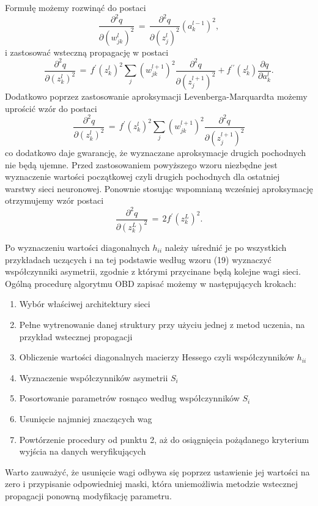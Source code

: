 Formułę możemy rozwinąć do postaci 
\begin{equation}
\frac{\partial^2 q}{\partial (w_{jk}^l)^2} \, = \, \frac{\partial^2 q}{\partial (z_j^{l})^2}(a_k^{l-1})^2 , 
\end{equation}
i zastosować wsteczną propagację w postaci
\begin{equation}
\frac{\partial^2q}{\partial (z_k^{l})^2} \, = \, f^{\prime}(z_k^l)^2 \sum_j (w_{jk}^{l+1})^2 \frac{\partial^2 q}{\partial (z_j^{l+1})^2} + f^{\prime \prime}(z_k^l) \frac{\partial q}{\partial a_k^l}. 
\end{equation}
Dodatkowo poprzez zastosowanie aproksymacji Levenberga-Marquardta możemy uprościć wzór do postaci
\begin{equation}
\frac{\partial^2q}{\partial (z_k^{l})^2} \, = \, f^{\prime}(z_k^l)^2 \sum_j (w_{jk}^{l+1})^2 \frac{\partial^2 q}{\partial (z_j^{l+1})^2}
\end{equation}
co dodatkowo daje gwarancję, że wyznaczane aproksymacje drugich pochodnych nie będą ujemne.
Przed zastosowaniem powyższego wzoru niezbędne jest wyznaczenie wartości początkowej czyli drugich pochodnych dla ostatniej warstwy sieci neuronowej. Ponownie stosując wspomnianą wcześniej aproksymację otrzymujemy wzór postaci
\begin{equation}
\frac{\partial^2q}{\partial (z_k^{L})^2} \, = \, 2f^{\prime}(z_k^{L})^2. 
\end{equation}
\par Po wyznaczeniu wartości diagonalnych \( h_{ii} \) należy uśrednić je po wszystkich przykładach uczących i na tej podstawie według wzoru (19) wyznaczyć współczynniki asymetrii, zgodnie z którymi przycinane będą kolejne wagi sieci. Ogólną procedurę algorytmu OBD zapisać możemy w następujących krokach: 
\begin{enumerate}
 \item Wybór właściwej architektury sieci
 \item Pełne wytrenowanie danej struktury przy użyciu jednej z metod uczenia, na przykład wstecznej propagacji
 \item Obliczenie wartości diagonalnych macierzy Hessego czyli współczynników \( h_{ii} \) 
 \item Wyznaczenie współczynników asymetrii \( S_i \)
 \item Posortowanie parametrów rosnąco według współczynników \( S_i \)
 \item Usunięcie najmniej znaczących wag
 \item Powtórzenie procedury od punktu 2, aż do osiągnięcia pożądanego kryterium wyjścia  na danych weryfikujących
\end{enumerate}
Warto zauważyć, że usunięcie wagi odbywa się poprzez ustawienie jej wartości na zero i przypisanie odpowiedniej maski, która uniemożliwia metodzie wstecznej propagacji ponowną modyfikację parametru.  

